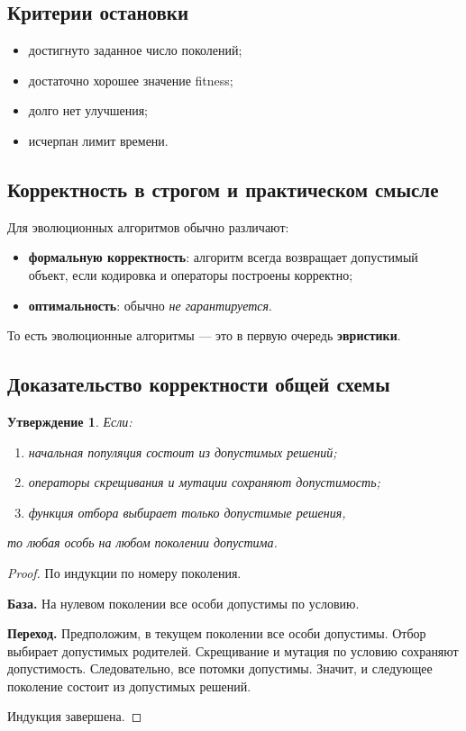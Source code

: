 \documentclass[12pt,a4paper]{article}
\theoremstyle{definition}
\theoremstyle{plain}
\newtheorem{proposition}{Утверждение}[section]
\begin{document}
\subsection{Критерии остановки}
\begin{itemize}
\item достигнуто заданное число поколений;
\item достаточно хорошее значение fitness;
\item долго нет улучшения;
\item исчерпан лимит времени.
\end{itemize}

\subsection{Корректность в строгом и практическом смысле}
Для эволюционных алгоритмов обычно различают:
\begin{itemize}
\item \textbf{формальную корректность}: алгоритм всегда возвращает допустимый объект, если кодировка и операторы построены корректно;
\item \textbf{оптимальность}: обычно \emph{не гарантируется}.
\end{itemize}

То есть эволюционные алгоритмы --- это в первую очередь \textbf{эвристики}.

\subsection{Доказательство корректности общей схемы}
\begin{proposition}
Если:
\begin{enumerate}
\item начальная популяция состоит из допустимых решений;
\item операторы скрещивания и мутации сохраняют допустимость;
\item функция отбора выбирает только допустимые решения,
\end{enumerate}
то любая особь на любом поколении допустима.
\end{proposition}

\begin{proof}
По индукции по номеру поколения.

\textbf{База.} На нулевом поколении все особи допустимы по условию.

\textbf{Переход.} Предположим, в текущем поколении все особи допустимы. Отбор выбирает допустимых родителей. Скрещивание и мутация по условию сохраняют допустимость. Следовательно, все потомки допустимы. Значит, и следующее поколение состоит из допустимых решений.

Индукция завершена.
\end{proof}
\end{document}
